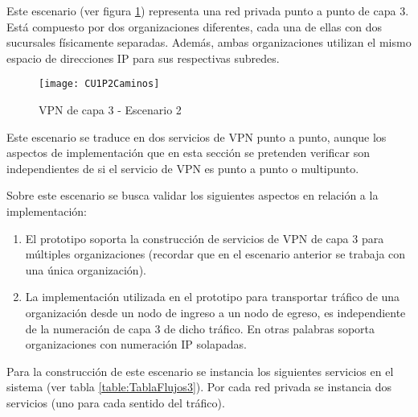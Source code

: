 Este escenario (ver figura \ref{fig:CUP2}) representa una red privada punto a punto de capa 3. Est\'a compuesto por dos organizaciones diferentes, cada una de ellas con dos sucursales f\'isicamente separadas. Adem\'as, ambas organizaciones utilizan el mismo espacio de direcciones IP para sus respectivas subredes.\\

\begin{figure}[h!] 
\centering    
\texttt{[image: CU1P2Caminos]}
\caption[VPN de capa 3 - Escenario 2]{VPN de capa 3 - Escenario 2}
\label{fig:CUP2}
\end{figure}


Este escenario se traduce en dos servicios de VPN punto a punto, aunque los aspectos de implementaci\'on que en esta secci\'on se pretenden verificar son independientes de si el servicio de VPN es punto a punto o multipunto.

Sobre este escenario se busca validar los siguientes aspectos en relaci\'on a la implementaci\'on:

\begin{enumerate}
\item El prototipo soporta la construcci\'on de servicios de VPN de capa 3 para múltiples organizaciones (recordar que en el escenario anterior se trabaja con una \'unica organización).

\item La implementaci\'on utilizada en el prototipo para transportar tr\'afico de una organización desde un nodo de ingreso a un nodo de egreso, es independiente de la numeraci\'on de capa 3 de dicho tr\'afico. En otras palabras soporta organizaciones con numeraci\'on IP solapadas.
\end{enumerate}

Para la construcci\'on de este escenario se instancia los siguientes servicios en el sistema (ver tabla \ref{table:TablaFlujos3}). Por cada red privada se instancia dos servicios (uno para cada sentido del tr\'afico).

